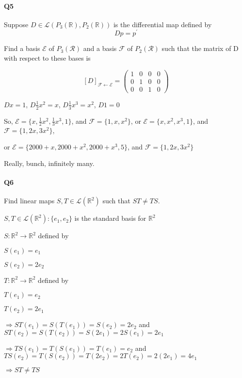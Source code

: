 \documentclass{article}
\begin{document}
\newpage
\paragraph{Q5} Suppose $D ∈ \mathcal{L}(P_3(\mathbb{R}),
P_2(\mathbb{R}))$ is the differential map defined by \[Dp = p^\prime\]

Find a basis $\mathcal{E}$ of $P_3(\mathcal{R})$ and a basis
$\mathcal{F}$ of $P_2(\mathcal{R})$ such that the matrix of D with
respect  to these bases is

\[ [D]_{\mathcal{F} \leftarrow \mathcal{E}} =
  \begin{pmatrix}
    1 & 0& 0& 0\\
    0 & 1& 0& 0\\
    0 & 0& 1& 0
  \end{pmatrix}
\]


$Dx = 1$, $D\frac{1}{2}x^2 = x$, $D\frac{1}{3}x^3 = x^2$, $D1 = 0$

So, $\mathcal{E} = \{x,\frac{1}{2}x^2,\frac{1}{3}x^3,1\}$, and
$\mathcal{F} = \{1,x,x^2\}$,
or $\mathcal{E} = \{x,x^2,x^3,1\}$, and
$\mathcal{F} = \{1,2x,3x^2\}$,

or
$\mathcal{E} = \{2000 + x, 2000 + x^2, 2000 + x^3,5\}$, and
$\mathcal{F} = \{1,2x,3x^2\}$

Really, bunch, infinitely many.


\paragraph{Q6} Find linear maps $S, T ∈ \mathcal{L}(\mathbb{R}^2)$
such that $ST \neq TS$.

$S , T \in \mathcal{L}(\mathbb{R}^2): \{e_1,e_2\}$ is the standard
basis for $\mathbb{R}^2$

$S: \mathbb{R}^2 \rightarrow \mathbb{R}^2$ defined by

$S(e_1) = e_1$

$S(e_2) = 2e_2$

$T: \mathbb{R}^2 \rightarrow \mathbb{R}^2$ defined by

$T(e_1) = e_2$

$T(e_2) = 2e_1$

$\Rightarrow ST(e_1) = S(T(e_1)) = S(e_2) = 2e_2$ and $ST(e_2) =
S(T(e_2)) = S(2e_1) = 2S(e_1)= 2e_1$

$\Rightarrow TS(e_1) = T(S(e_1)) = T(e_1) = e_2$ and $TS(e_2) =
T(S(e_2)) = T(2e_2) = 2T(e_2)= 2(2e_1) = 4e_1$

$\Rightarrow ST \neq TS$
\end{document}
